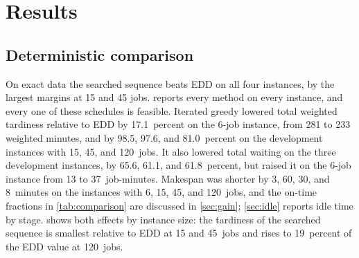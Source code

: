 \section{Results}\label{sec:results}

\subsection{Deterministic comparison}\label{sec:deterministic}

\sumpara On exact data the searched sequence beats EDD on all four instances, by the largest margins at 15 and 45 jobs. \sumparaend
\fin {} reports every method on every instance, and every one of these schedules is feasible. \fine
\fin Iterated greedy lowered total weighted tardiness relative to EDD by 17.1~percent on the 6-job instance, from 281 to 233 weighted minutes, and by 98.5, 97.6, and 81.0~percent on the development instances with 15, 45, and 120~jobs. \fine
\fin It also lowered total waiting on the three development instances, by 65.6, 61.1, and 61.8~percent, but raised it on the 6-job instance from 13 to 37~job-minutes. \fine
\fin Makespan was shorter by 3, 60, 30, and 8~minutes on the instances with 6, 15, 45, and 120~jobs, and the on-time fractions in \cref{tab:comparison} are discussed in \cref{sec:gain}; \cref{sec:idle} reports idle time by stage. \fine
\fin {} shows both effects by instance size: the tardiness of the searched sequence is smallest relative to EDD at 15 and 45~jobs and rises to 19~percent of the EDD value at 120~jobs. \fine

